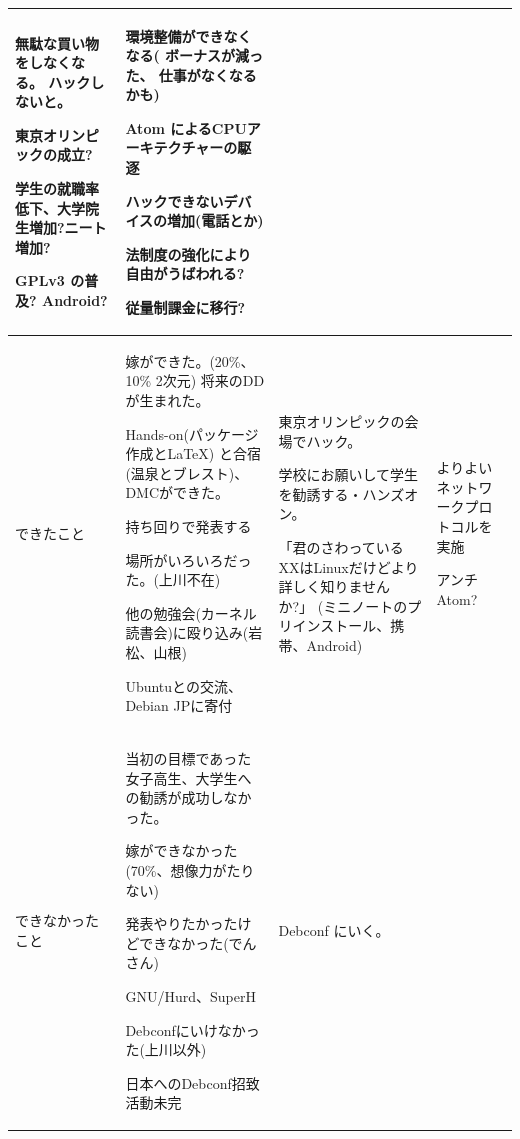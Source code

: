 \documentclass[mingoth,a4paper]{jsarticle}
\begin{document}
\begin{commandline}
\begin{tabular}[t]{|p{4em}|p{11em}|p{11em}|p{11em}|}
無駄な買い物をしなくなる。
ハックしないと。

東京オリンピックの成立?

学生の就職率低下、大学院生増加?ニート増加?

GPLv3 の普及?
Android?

&

環境整備ができなくなる(
ボーナスが減った、
仕事がなくなるかも)

Atom によるCPUアーキテクチャーの駆逐

ハックできないデバイスの増加(電話とか)

法制度の強化により自由がうばわれる?

従量制課金に移行?

\\
\hline
できたこと & 

嫁ができた。(20\%、10\% 2次元)
将来のDDが生まれた。

Hands-on(パッケージ作成と\LaTeX{}) と合宿(温泉とブレスト)、
DMCができた。

持ち回りで発表する

場所がいろいろだった。(上川不在)

他の勉強会(カーネル読書会)に殴り込み(岩松、山根)

Ubuntuとの交流、Debian JPに寄付

&

東京オリンピックの会場でハック。

学校にお願いして学生を勧誘する・ハンズオン。

「君のさわっているXXはLinuxだけどより詳しく知りませんか?」
(ミニノートのプリインストール、携帯、Android)

& 

よりよいネットワークプロトコルを実施

アンチAtom?

\\
\hline

できなかったこと
&

当初の目標であった女子高生、大学生への勧誘が成功しなかった。

嫁ができなかった(70\%、想像力がたりない)

発表やりたかったけどできなかった(でんさん)

GNU/Hurd、SuperH

Debconfにいけなかった(上川以外)

日本へのDebconf招致活動未完

&

Debconf にいく。


\end{tabular}
\end{commandline}
\end{document}
